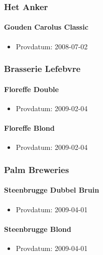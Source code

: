 \documentclass[11pt]{article}
\begin{document}
\subsubsection{Het Anker}
\label{sec:org0c174fa}
\paragraph{Gouden Carolus Classic}
\label{sec:org266c258}
\begin{itemize}
\item Provdatum: 2008-07-02
\end{itemize}
\subsubsection{Brasserie Lefebvre}
\label{sec:orgafe1258}
\paragraph{Floreffe Double}
\label{sec:orgcc98d72}
\begin{itemize}
\item Provdatum: 2009-02-04
\end{itemize}
\paragraph{Floreffe Blond}
\label{sec:org3f4d5d8}
\begin{itemize}
\item Provdatum: 2009-02-04
\end{itemize}
\subsubsection{Palm Breweries}
\label{sec:org95e090e}
\paragraph{Steenbrugge Dubbel Bruin}
\label{sec:org2ca9d30}
\begin{itemize}
\item Provdatum: 2009-04-01
\end{itemize}
\paragraph{Steenbrugge Blond}
\label{sec:org3c6a199}
\begin{itemize}
\item Provdatum: 2009-04-01
\end{itemize}
\end{document}
